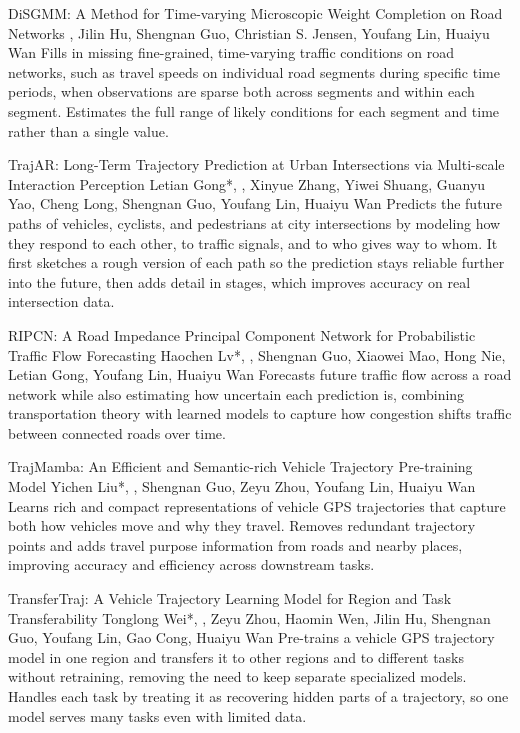 {DiSGMM: A Method for Time-varying Microscopic Weight Completion on Road Networks}
{\me, Jilin Hu, Shengnan Guo, Christian S. Jensen, Youfang Lin, Huaiyu Wan}
{Fills in missing fine-grained, time-varying traffic conditions on road networks, such as travel speeds on individual road segments during specific time periods, when observations are sparse both across segments and within each segment. Estimates the full range of likely conditions for each segment and time rather than a single value.}

{TrajAR: Long-Term Trajectory Prediction at Urban Intersections via Multi-scale Interaction Perception}
{Letian Gong*, \me*, Xinyue Zhang, Yiwei Shuang, Guanyu Yao, Cheng Long, Shengnan Guo, Youfang Lin, Huaiyu Wan}
{Predicts the future paths of vehicles, cyclists, and pedestrians at city intersections by modeling how they respond to each other, to traffic signals, and to who gives way to whom. It first sketches a rough version of each path so the prediction stays reliable further into the future, then adds detail in stages, which improves accuracy on real intersection data.}

{RIPCN: A Road Impedance Principal Component Network for Probabilistic Traffic Flow Forecasting}
{Haochen Lv*, \me*, Shengnan Guo, Xiaowei Mao, Hong Nie, Letian Gong, Youfang Lin, Huaiyu Wan}
{Forecasts future traffic flow across a road network while also estimating how uncertain each prediction is, combining transportation theory with learned models to capture how congestion shifts traffic between connected roads over time.}

{TrajMamba: An Efficient and Semantic-rich Vehicle Trajectory Pre-training Model}
{Yichen Liu*, \me*, Shengnan Guo, Zeyu Zhou, Youfang Lin, Huaiyu Wan}
{Learns rich and compact representations of vehicle GPS trajectories that capture both how vehicles move and why they travel. Removes redundant trajectory points and adds travel purpose information from roads and nearby places, improving accuracy and efficiency across downstream tasks.}

{TransferTraj: A Vehicle Trajectory Learning Model for Region and Task Transferability}
{Tonglong Wei*, \me*, Zeyu Zhou, Haomin Wen, Jilin Hu, Shengnan Guo, Youfang Lin, Gao Cong, Huaiyu Wan}
{Pre-trains a vehicle GPS trajectory model in one region and transfers it to other regions and to different tasks without retraining, removing the need to keep separate specialized models. Handles each task by treating it as recovering hidden parts of a trajectory, so one model serves many tasks even with limited data.}

